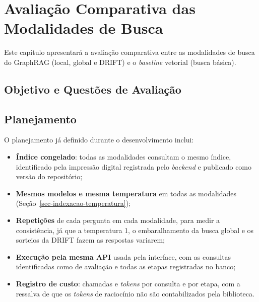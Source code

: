 \chapter{Avaliação Comparativa das Modalidades de Busca}
\label{sec-avaliacao}


Este capítulo apresentará a avaliação comparativa entre as modalidades de busca do GraphRAG (local, global e DRIFT) e o \textit{baseline} vetorial (busca básica).

\section{Objetivo e Questões de Avaliação}
\label{sec-avaliacao-objetivo}


\section{Planejamento}
\label{sec-avaliacao-planejamento}

O planejamento já definido durante o desenvolvimento inclui:

\begin{itemize}
    \item \textbf{Índice congelado}: todas as modalidades consultam o mesmo índice, identificado pela impressão digital registrada pelo \textit{backend} e publicado como versão  do repositório;
    \item \textbf{Mesmos modelos e mesma temperatura} em todas as modalidades (Seção~\ref{sec-indexacao-temperatura});
    \item \textbf{Repetições} de cada pergunta em cada modalidade, para medir a consistência, já que a temperatura 1, o embaralhamento da busca global e os sorteios da DRIFT fazem as respostas variarem;
    \item \textbf{Execução pela mesma API} usada pela interface, com as consultas identificadas como de avaliação e todas as etapas registradas no banco;
    \item \textbf{Registro de custo}: chamadas e \textit{tokens} por consulta e por etapa, com a ressalva de que os \textit{tokens} de raciocínio não são contabilizados pela biblioteca.
\end{itemize}

